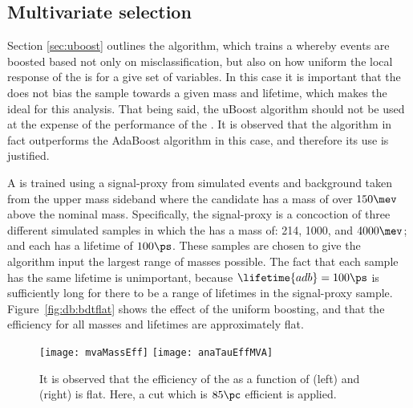\subsection{Multivariate selection}
Section \ref{sec:uboost} outlines the \uBDT algorithm, which trains a \BDT whereby events are
boosted based not only on misclassification, but also on how uniform the local response of the \BDT
is for a give set of variables.
In this case it is important that the \BDT does not bias the sample towards a given mass and
lifetime, which makes the \uBDT ideal for this analysis.
That being said, the uBoost algorithm should not be used at the expense of the performance of the
\BDT.
It is observed that the \uBDT algorithm in fact outperforms the AdaBoost algorithm in this case,
and therefore its use is justified.

A \uBDT is trained using a signal-proxy from simulated events and background taken from the upper
\Bd mass sideband where the \Bd candidate has a mass of over $150\mev$ above the nominal \Bd mass.
Specifically, the signal-proxy is a concoction of three different simulated samples in which the
\db has a mass of: 214, 1000, and $4000\mev$; and each has a lifetime of $100\ps$.
These samples are chosen to give the \uBDT algorithm input the largest range of masses possible.
The fact that each sample has the same lifetime is unimportant, because $\lifetime{adb}=100\ps$ is
sufficiently long for there to be a range of lifetimes in the signal-proxy sample.
Figure~\ref{fig:db:bdtflat} shows the effect of the uniform boosting, and that the efficiency for
all masses and lifetimes are approximately flat.

\begin{figure}
  \begin{center}
    \texttt{[image: mvaMassEff]}
    \texttt{[image: anaTauEffMVA]}
    \caption{
      It is observed that the efficiency of the \uBDT as a function of
      (left) \mdb and
      (right) \tdb is flat.
      Here, a cut which is \approx$85\pc$ efficient is applied.
    }
    \label{fig:bdt:eff:tau}
  \end{center}
\end{figure}


